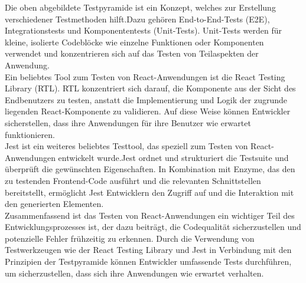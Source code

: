 Die oben abgebildete Testpyramide ist ein Konzept, welches zur Erstellung verschiedener Testmethoden hilft.Dazu gehören End-to-End-Tests (E2E), Integrationstests und Komponententests (Unit-Tests). Unit-Tests werden für kleine, isolierte Codeblöcke wie einzelne Funktionen oder Komponenten verwendet und konzentrieren sich auf das Testen von Teilaspekten der Anwendung.\\
Ein beliebtes Tool zum Testen von React-Anwendungen ist die React Testing Library (RTL). RTL konzentriert sich darauf, die Komponente aus der Sicht des Endbenutzers zu testen, anstatt die Implementierung und Logik der zugrunde liegenden React-Komponente zu validieren. Auf diese Weise können Entwickler sicherstellen, dass ihre Anwendungen für ihre Benutzer wie erwartet funktionieren.\cite{react-test-runebook}\\ 
Jest ist ein weiteres beliebtes Testtool, das speziell zum Testen von React-Anwendungen entwickelt wurde.Jest ordnet und strukturiert die Testsuite und überprüft die gewünschten Eigenschaften. In Kombination mit Enzyme, das den zu testenden Frontend-Code ausführt und die relevanten Schnittstellen bereitstellt, ermöglicht Jest Entwicklern den Zugriff auf und die Interaktion mit den generierten Elementen.\cite{react-test-ix}\\

Zusammenfassend ist das Testen von React-Anwendungen ein wichtiger Teil des Entwicklungsprozesses ist, der dazu beiträgt, die Codequalität sicherzustellen und potenzielle Fehler frühzeitig zu erkennen. Durch die Verwendung von Testwerkzeugen wie der React Testing Library und Jest in Verbindung mit den Prinzipien der Testpyramide können Entwickler umfassende Tests durchführen, um sicherzustellen, dass sich ihre Anwendungen wie erwartet verhalten.

